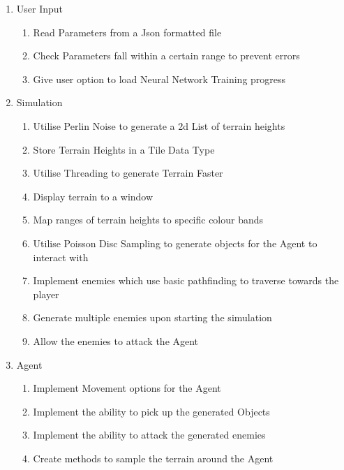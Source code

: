 \begin{flushleft}
            \begin{enumerate}
                \item User Input
                    \begin{enumerate}
                        \item Read Parameters from a Json formatted file
                        \item Check Parameters fall within a certain range to prevent errors
                        \item Give user option to load Neural Network Training progress
                    \end{enumerate}
                \item Simulation
                    \begin{enumerate}
                        \item Utilise Perlin Noise to generate a 2d List of terrain heights
                        \item Store Terrain Heights in a Tile Data Type
                        \item Utilise Threading to generate Terrain Faster
                        \item Display terrain to a window
                        \item Map ranges of terrain heights to specific colour bands
                        \item Utilise Poisson Disc Sampling to generate objects for the Agent to interact with
                        \item Implement enemies which use basic pathfinding to traverse towards the player
                        \item Generate multiple enemies upon starting the simulation
                        \item Allow the enemies to attack the Agent
                    \end{enumerate}   
                \item Agent
                    \begin{enumerate}
                        \item Implement Movement options for the Agent
                        \item Implement the ability to pick up the generated Objects
                        \item Implement the ability to attack the generated enemies
                        \item Create methods to sample the terrain around the Agent

\end{enumerate}
\end{enumerate}
\end{flushleft}
